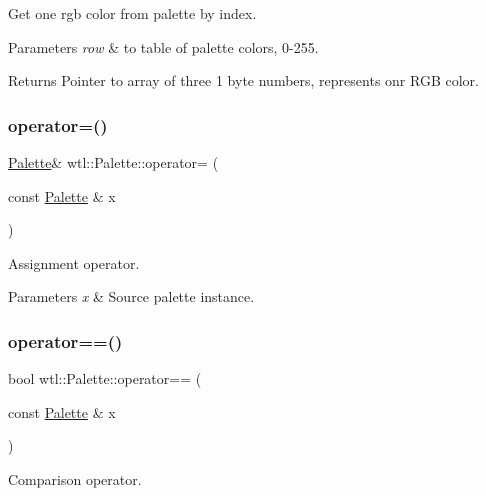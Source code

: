 Get one rgb color from palette by index. 


\begin{DoxyParams}{Parameters}
{\em row} & to table of palette colors, 0-\/255. \\
\hline
\end{DoxyParams}
\begin{DoxyReturn}{Returns}
Pointer to array of three 1 byte numbers, represents onr R\+GB color. 
\end{DoxyReturn}
\mbox{\label{classwtl_1_1_palette_a9f5a50d8074f6a6bab338c9624771d2d}} 
\subsubsection{\texorpdfstring{operator=()}{operator=()}}
{\footnotesize\ttfamily \hyperlink{classwtl_1_1_palette}{Palette}\& wtl\+::\+Palette\+::operator= (\begin{DoxyParamCaption}\item[{const \hyperlink{classwtl_1_1_palette}{Palette} \&}]{x }\end{DoxyParamCaption})}



Assignment operator. 


\begin{DoxyParams}{Parameters}
{\em x} & Source palette instance. \\
\hline
\end{DoxyParams}
\mbox{\label{classwtl_1_1_palette_a5d98b8f496d440b3cc2e3e5f4ee8ddc8}} 
\subsubsection{\texorpdfstring{operator==()}{operator==()}}
{\footnotesize\ttfamily bool wtl\+::\+Palette\+::operator== (\begin{DoxyParamCaption}\item[{const \hyperlink{classwtl_1_1_palette}{Palette} \&}]{x }\end{DoxyParamCaption})}



Comparison operator. 


